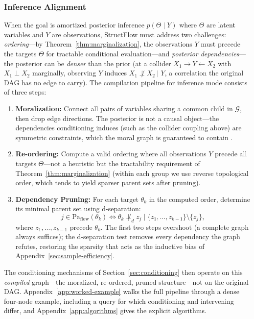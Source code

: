 \subsubsection{Inference Alignment}
When the goal is amortized posterior inference $p(\Theta \mid Y)$ where $\Theta$ are latent variables and $Y$ are observations, StructFlow must address two challenges: \emph{ordering}---by Theorem~\ref{thm:marginalization}, the observations $Y$ must precede the targets $\Theta$ for tractable conditional evaluation---and \emph{posterior dependencies}---the posterior can be \emph{denser} than the prior (at a collider $X_1 \to Y \leftarrow X_2$ with $X_1 \perp X_2$ marginally, observing $Y$ induces $X_1 \not\perp X_2 \mid Y$, a correlation the original DAG has no edge to carry). The compilation pipeline for inference mode consists of three steps:
\begin{enumerate}
    \item \textbf{Moralization:} Connect all pairs of variables sharing a common child in $\mathcal{G}$, then drop edge directions. The posterior is not a causal object---the dependencies conditioning induces (such as the collider coupling above) are symmetric constraints, which the moral graph is guaranteed to contain \citep{Koller2009}.

    \item \textbf{Re-ordering:} Compute a valid ordering where all observations $Y$ precede all targets $\Theta$---not a heuristic but the tractability requirement of Theorem~\ref{thm:marginalization} (within each group we use reverse topological order, which tends to yield sparser parent sets after pruning).

    \item \textbf{Dependency Pruning:} For each target $\theta_k$ in the computed order, determine its minimal parent set using d-separation:
    \begin{equation}
        j \in \mathrm{Pa}_{\text{flow}}(\theta_k) \iff \theta_k \not\perp_d z_j \mid \{z_1, \dots, z_{k-1}\} \setminus \{z_j\},
    \end{equation}
    where $z_1, \dots, z_{k-1}$ precede $\theta_k$. The first two steps overshoot (a complete graph always suffices); the d-separation test removes every dependency the graph refutes, restoring the sparsity that acts as the inductive bias of Appendix~\ref{sec:sample-efficiency}.
\end{enumerate}

The conditioning mechanisms of Section~\ref{sec:conditioning} then operate on this \emph{compiled} graph---the moralized, re-ordered, pruned structure---not on the original DAG.  Appendix~\ref{app:worked-example} walks the full pipeline through a dense four-node example, including a query for which conditioning and intervening differ, and Appendix~\ref{app:algorithms} gives the explicit algorithms.

